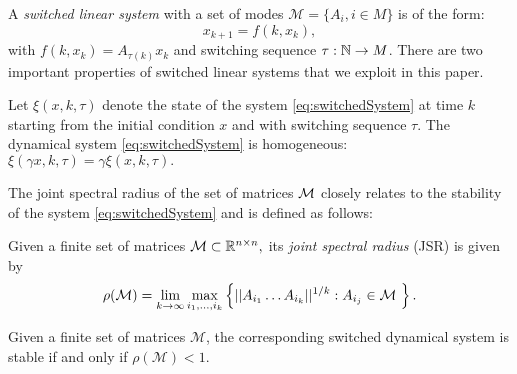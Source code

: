 A \emph{switched linear system} with a set of modes \mbox{$\mathcal{M}= \{A_i, i \in M \}$} is of the form:
\begin{equation}\label{eq:switchedSystem}x_{k+1} = f(k,x_k),\end{equation}
with $f(k,x_k) = A_{\tau(k)}x_k$ and switching sequence \mbox{$\tau: \mathbb{N} \to M$.} There are two important properties of switched linear systems that we exploit in this paper.
\begin{property}\label{property:homogeneity}
Let $\xi(x, k, \tau)$ denote the state of the system \eqref{eq:switchedSystem} at time $k$ starting from the initial condition $x$ and with switching sequence $\tau$. The dynamical system \eqref{eq:switchedSystem} is homogeneous: $\xi(\gamma x, k, \tau)= \gamma \xi(x, k, \tau).$
\end{property}



The joint spectral radius of the set of matrices $\mathcal{M}$ closely relates to the stability of the system \eqref{eq:switchedSystem} and is defined as follows:
\begin{definition} Given a finite set of matrices \mbox{$\mathcal{M} \subset \mathbb{R}^{n\times n},$} its \emph{joint spectral radius} (JSR) is given by
$$\rho(\mathcal{M}) =\lim_{k\rightarrow \infty} \max_{i_1,\dots, i_k} \left\{||A_{i_1} \dots A_{i_k}||^{1/k}: A_{i_j}\in\mathcal{M}\ \right\}. $$
\end{definition}

\begin{property}
Given a finite set of matrices $\mathcal{M}$, the corresponding switched dynamical system is stable if and only if $\rho(\mathcal{M})<1$.
\end{property}

